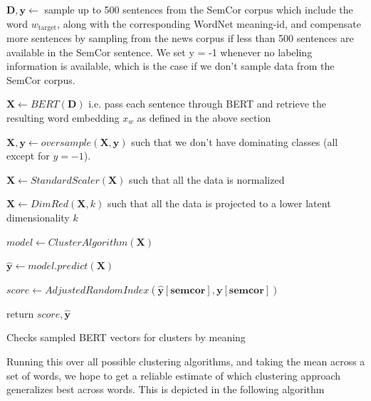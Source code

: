 \documentclass[a4paper,12pt,twoside,openright]{report}
\begin{document}
\begin{algorithm}[H]
\SetAlgoLined
{}

 $\mathbf{D}, \mathbf{y} \leftarrow $  sample up to 500 sentences from the SemCor corpus which include the word $w_{\text{target}}$, along with the corresponding WordNet meaning-id, and compensate more sentences by sampling from the news corpus if less than 500 sentences are available in the SemCor sentence.
We set y = -1 whenever no labeling information is available, which is the case if we don't sample data from the SemCor corpus.\;

$ \mathbf{X} \leftarrow BERT( \mathbf{D} )$ i.e. pass each sentence through BERT and retrieve the resulting word embedding $x_w$ as defined in the above section\;
 
$ \mathbf{X}, \mathbf{y} \leftarrow oversample( \mathbf{X}, \mathbf{y} )$ such that we don't have dominating classes (all except for $y = -1$).\;
 
$ \mathbf{X} \leftarrow StandardScaler( \mathbf{X})$ such that all the data is normalized\;

$ \mathbf{X} \leftarrow DimRed( \mathbf{X}, k )$ such that all the data is projected to a lower latent dimensionality $k$\;

$ model \leftarrow ClusterAlgorithm( \mathbf{X})$ \;

$ \mathbf{\hat{y}} \leftarrow model.predict(\mathbf{X}) $ \;

$ score \leftarrow AdjustedRandomIndex(\mathbf{\hat{y}[semcor]}, \mathbf{y[semcor]}) $ \;

return $ score, \mathbf{\hat{y}}$\;
    
 \caption{Checks sampled BERT vectors for clusters by  meaning}
\end{algorithm}

Running this over all possible clustering algorithms, and taking the mean across a set of words, we hope to get a reliable estimate of which clustering approach generalizes best across words.
This is depicted in the following algorithm
\end{document}
